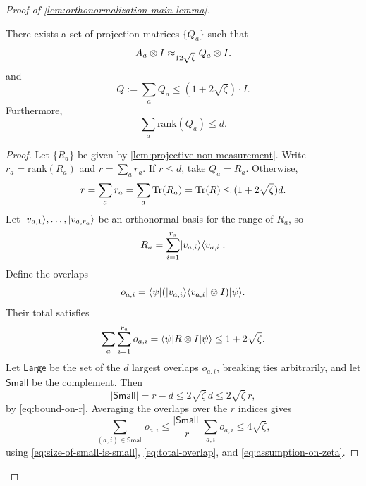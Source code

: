 \begin{proof}[Proof of \ref{lem:orthonormalization-main-lemma}]
	\begin{lemma}\label{lem:projective-low-rank-sum}
		\leanok
		There exists a set of projection matrices $\{Q_a\}$ such that
		\begin{equation*}
			A_a \otimes I \approx_{12\sqrt{\zeta}} Q_a \otimes I.
		\end{equation*}
		and
		\begin{equation*}
			Q:= \sum_a Q_a \leq (1+2\sqrt{\zeta}) \cdot I.
		\end{equation*}
		Furthermore,
		\begin{equation*}
			\sum_a \mathrm{rank}(Q_a) \leq d.
		\end{equation*}
	\end{lemma}
	\begin{proof}
		\leanok
		Let $\{R_a\}$ be given by \ref{lem:projective-non-measurement}. Write $r_a=\mathrm{rank}(R_a)$ and $r=\sum_a r_a$. If $r \leq d$, take $Q_a=R_a$. Otherwise,
		\begin{equation}\label{eq:bound-on-r}
			r
			=
			\sum_a r_a
			=
			\sum_a \operatorname{Tr}(R_a)
			=
			\operatorname{Tr}(R)
			\leq
			(1+2\sqrt{\zeta})d.
		\end{equation}
		Let $\lvert v_{a,1} \rangle,\ldots,\lvert v_{a,r_a} \rangle$ be an orthonormal basis for the range of $R_a$, so
		\[
			R_a = \sum_{i=1}^{r_a} \lvert v_{a,i} \rangle\langle v_{a,i} \rvert.
		\]
		Define the overlaps
		\[
			o_{a,i} = \langle \psi \rvert (\lvert v_{a,i} \rangle\langle v_{a,i} \rvert \otimes I)\lvert \psi \rangle.
		\]
		Their total satisfies
		\begin{equation}\label{eq:total-overlap}
			\sum_a \sum_{i=1}^{r_a} o_{a,i}
			=
			\langle \psi \rvert R \otimes I \lvert \psi \rangle
			\leq
			1+2\sqrt{\zeta}.
		\end{equation}
		Let $\mathsf{Large}$ be the set of the $d$ largest overlaps $o_{a,i}$, breaking ties arbitrarily, and let $\mathsf{Small}$ be the complement. Then
		\begin{equation}\label{eq:size-of-small-is-small}
			|\mathsf{Small}|
			=
			r-d
			\leq
			2\sqrt{\zeta}\,d
			\leq
			2\sqrt{\zeta}\,r,
		\end{equation}
		by \ref{eq:bound-on-r}. Averaging the overlaps over the $r$ indices gives
		\begin{equation}\label{eq:small-overlaps}
			\sum_{(a,i)\in \mathsf{Small}} o_{a,i}
			\leq
			\frac{|\mathsf{Small}|}{r}\sum_{a,i} o_{a,i}
			\leq
			4\sqrt{\zeta},
		\end{equation}
		using \ref{eq:size-of-small-is-small}, \ref{eq:total-overlap}, and \ref{eq:assumption-on-zeta}.


\end{proof}
\end{proof}
